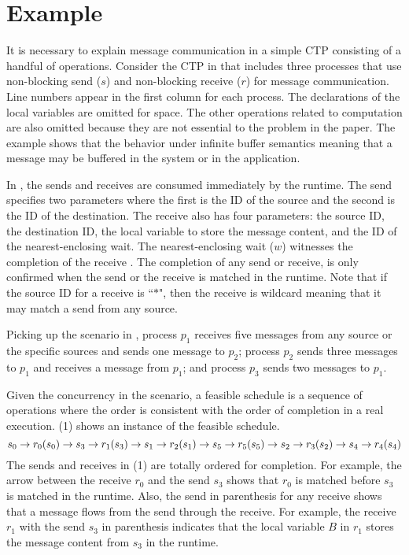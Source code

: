 \section{Example}

\examplefigone

It is necessary to explain message communication in a simple CTP consisting of a handful of operations. Consider the CTP in  that includes three processes that use non-blocking send ($s$) and non-blocking receive ($r$) for message communication. Line numbers appear in the first column for each process. The declarations of the local variables are omitted for space. The other operations related to computation are also omitted because they are not essential to the problem in the paper.
The example shows that the behavior under infinite buffer semantics meaning that a message may be buffered in the system or in the application.

In , the sends and receives are consumed immediately by the runtime. The send specifies two parameters where the first is the ID of the source and the second is the ID of the destination. The receive also has four parameters: the source ID, the destination ID, the local variable to store the message content, and the ID of the nearest-enclosing wait. The nearest-enclosing wait ($w$) witnesses the completion of the receive \cite{DBLP:conf/kbse/HuangMM13}. The completion of any send or receive, is only confirmed when the send or the receive is matched in the runtime. Note that if the source ID for a receive is ``$\ast$", then the receive is wildcard meaning that it may match a send from any source. 

Picking up the scenario in , process $p_1$ receives five messages from any source or the specific sources and sends one message to $p_2$; process $p_2$ sends three messages to $p_1$ and receives a message from $p_1$; and process $p_3$ sends two messages to $p_1$. 

Given the concurrency in the scenario, a feasible schedule is a sequence of operations where the order is consistent with the order of completion in a real execution. (1) shows an instance of the feasible schedule. 
\begin{equation}
\scriptsize
s_0\rightarrow r_0 (s_0)\rightarrow s_3\rightarrow r_1 (s_3)\rightarrow s_1\rightarrow r_2 (s_1)\rightarrow 
s_5\rightarrow r_5 (s_5)\rightarrow s_2\rightarrow r_3 (s_2)\rightarrow s_4\rightarrow r_4 (s_4)
\end{equation} 
The sends and receives in (1) are totally ordered for completion. For example, the arrow between the receive $r_0$ and the send $s_3$ shows that $r_0$ is matched before $s_3$ is matched in the runtime. 
Also, the send in parenthesis for any receive shows that a message flows from the send through the receive. 
For example, the receive $r_1$ with the send $s_3$ in parenthesis indicates that the local variable $B$ in $r_1$ stores the message content from $s_3$ in the runtime. 

